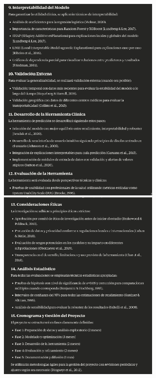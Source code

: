 \documentclass{article}
\begin{document}
\begin{center}
    \includegraphics[width=0.6\textwidth]{../claude_5_3.png}\\
    \includegraphics[width=0.6\textwidth]{../claude_6_3.png}\\
\end{center}
\newpage


\end{document}
